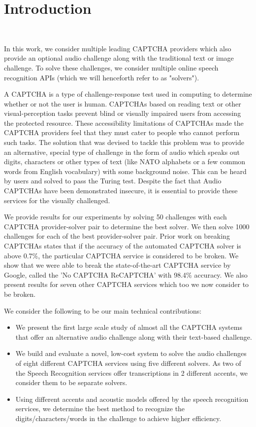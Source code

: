 \section{Introduction}\mbox{}\
\label{sec:intro}

In this work, we consider multiple leading CAPTCHA providers which also provide an optional audio challenge along with the traditional text or image challenge. To solve these challenges, we consider multiple online speech recognition APIs (which we will henceforth refer to as "solvers"). \newline

A CAPTCHA is a type of challenge-response test used in computing to determine whether or not the user is human. CAPTCHAs based on reading text or other visual-perception tasks prevent blind or visually impaired users from accessing the protected resource. These accessibility limitations of CAPTCHAs made the CAPTCHA providers feel that they must cater to people who cannot perform such tasks. The solution that was devised to tackle this problem was to provide an alternative, special type of challenge in the form of audio which speaks out digits, characters or other types of text (like NATO alphabets or a few common words from English vocabulary) with some background noise. This can be heard by users and solved to pass the Turing test. Despite the fact that Audio CAPTCHAs have been demonstrated insecure, it is essential to provide these services for the visually challenged. \newline

We provide results for our experiments by solving 50 challenges with each CAPTCHA provider-solver pair to determine the best solver. We then solve 1000 challenges for each of the best provider-solver pair. Prior work on breaking CAPTCHAs states that if the accuracy of the automated CAPTCHA solver is above 0.7\%, the particular CAPTCHA service is considered to be broken. We show that we were able to break the state-of-the-art CAPTCHA service by Google, called the 'No CAPTCHA ReCAPTCHA' with 98.4\% accuracy. We also present results for seven other CAPTCHA services which too we now consider to be broken.\newline

We consider the following to be our main technical contributions:
\begin{itemize}
\item We present the first large scale study of almost all the CAPTCHA systems that offer an alternative audio challenge along with their text-based challenge.
\item We build and evaluate a novel, low-cost system to solve the audio challenges of eight different CAPTCHA services using five different solvers. As two of the Speech Recognition services offer transcriptions in 2 different accents, we consider them to be separate solvers. 
\item Using different accents and acoustic models offered by the speech recognition services, we determine the best method to recognize the digits/characters/words in the challenge to achieve higher efficiency.
\end{itemize}